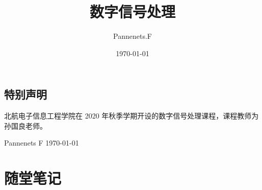\documentclass[cn,11pt,chinese,black,simple]{elegantbook}
\title{数字信号处理}
\author{Pannenets.F}
\date{\today}
\begin{document}
\maketitle
\frontmatter

\chapter*{特别声明}

北航电子信息工程学院在 2020 年秋季学期开设的数字信号处理课程，课程教师为孙国良老师。

% 

\begin{flushright}
Pannenets F
\today
\end{flushright}

\tableofcontents

\listofchanges

\mainmatter

\part{随堂笔记}














\end{document}
